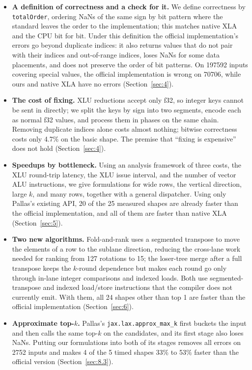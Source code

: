 \documentclass[sigconf,nonacm,balance=false]{acmart}
\newcommand{\code}[1]{\texttt{#1}}
\begin{document}
\begin{itemize}
\item \textbf{A definition of correctness and a check for it.} We define correctness by \code{total\allowbreak{}Order}, ordering NaNs of the same sign by bit pattern where the standard leaves the order to the implementation; this matches native XLA and the CPU bit for bit. Under this definition the official implementation's errors go beyond duplicate indices: it also returns values that do not pair with their indices and out-of-range indices, loses NaNs for some data placements, and does not preserve the order of bit patterns. On 197592 inputs covering special values, the official implementation is wrong on 70706, while ours and native XLA have no errors (Section~\ref{sec:4}).
\item \textbf{The cost of fixing.} XLU reductions accept only f32, so integer keys cannot be sent in directly; we split the keys by sign into two segments, encode each as normal f32 values, and process them in phases on the same chain. Removing duplicate indices alone costs almost nothing; bitwise correctness costs only 4.7\% on the basic shape. The premise that ``fixing is expensive'' does not hold (Section~\ref{sec:4}).
\item \textbf{Speedups by bottleneck.} Using an analysis framework of three costs, the XLU round-trip latency, the XLU issue interval, and the number of vector ALU instructions, we give formulations for wide rows, the vertical direction, large $k$, and many rows, together with a general dispatcher. Using only Pallas's existing API, 20 of the 25 measured shapes are already faster than the official implementation, and all of them are faster than native XLA (Section~\ref{sec:5}).
\item \textbf{Two new algorithms.} Fold-and-rank uses a segmented transpose to move the elements of a row to the sublane direction, reducing the cross-lane work needed for ranking from 127 rotations to 15; the loser-tree merge after a full transpose keeps the $k$-round dependence but makes each round go only through in-lane integer comparisons and indexed loads. Both use segmented-transpose and indexed load/store instructions that the compiler does not currently emit. With them, all 24 shapes other than top 1 are faster than the official implementation (Section~\ref{sec:6}).
\item \textbf{Approximate top-$k$.} Pallas's \code{jax.\allowbreak{}lax.\allowbreak{}approx\_\allowbreak{}max\_\allowbreak{}k} first buckets the input and then calls the same top-$k$ on the candidates, and its first stage also loses NaNs. Putting our formulations into both of its stages removes all errors on 2752 inputs and makes 4 of the 5 timed shapes 33\% to 53\% faster than the official version (Section~\ref{sec:8.3}).

\end{itemize}
\end{document}
